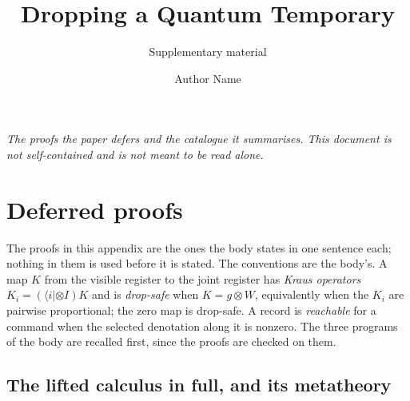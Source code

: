 \documentclass[acmsmall,screen,review,anonymous,nonacm]{acmart}
\begin{document}
\title{Dropping a Quantum Temporary}
\subtitle{Supplementary material}

\author{Author Name}

\maketitle

\noindent\textit{The proofs the paper defers and the catalogue it summarises.
This document is not self-contained and is not meant to be read alone.}


\section{Deferred proofs}\label{app:proofs}

The proofs in this appendix are the ones the body states in one sentence
each; nothing in them is used before it is stated. The conventions are the
body's. A map $K$ from the visible register to the joint register has
\emph{Kraus operators} $K_i = (\langle i| \otimes I)K$ and is \emph{drop-safe}
when $K = g \otimes W$, equivalently when the $K_i$ are pairwise
proportional; the zero map is drop-safe. A record is \emph{reachable} for a
command when the selected denotation along it is nonzero. The three programs of the body
are recalled first, since the proofs are checked on them.

\exRunning

\subsection{The lifted calculus in full, and its metatheory}\label{app:meta}
\end{document}
